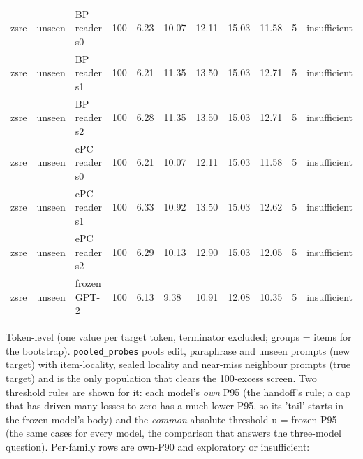 \documentclass[10pt,a4paper]{article}
\begin{document}
\begin{center}
\begin{tabularx}{\textwidth}{@{}p{}XXXXXXXXXX@{}}
zsre & unseen & BP reader s0 & 100 & 6.23 & 10.07 & 12.11 & 15.03 & 11.58 & 5 & insufficient \\
zsre & unseen & BP reader s1 & 100 & 6.21 & 11.35 & 13.50 & 15.03 & 12.71 & 5 & insufficient \\
zsre & unseen & BP reader s2 & 100 & 6.28 & 11.35 & 13.50 & 15.03 & 12.71 & 5 & insufficient \\
zsre & unseen & ePC reader s0 & 100 & 6.21 & 10.07 & 12.11 & 15.03 & 11.58 & 5 & insufficient \\
zsre & unseen & ePC reader s1 & 100 & 6.33 & 10.92 & 13.50 & 15.03 & 12.62 & 5 & insufficient \\
zsre & unseen & ePC reader s2 & 100 & 6.29 & 10.13 & 12.90 & 15.03 & 12.05 & 5 & insufficient \\
zsre & unseen & frozen GPT-2 & 100 & 6.13 & 9.38 & 10.91 & 12.08 & 10.35 & 5 & insufficient \\
\bottomrule
\end{tabularx}
\end{center}



Token-level (one value per target token, terminator excluded; groups = items for the bootstrap). \texttt{pooled\_probes} pools edit, paraphrase and unseen prompts (new target) with item-locality, sealed locality and near-miss neighbour prompts (true target) and is the only population that clears the 100-excess screen. Two threshold rules are shown for it: each model's \emph{own} P95 (the handoff's rule; a cap that has driven many losses to zero has a much lower P95, so its 'tail' starts in the frozen model's body) and the \emph{common} absolute threshold u = frozen P95 (the same cases for every model, the comparison that answers the three-model question). Per-family rows are own-P90 and exploratory or insufficient:
\end{document}
